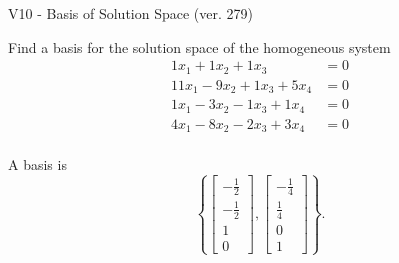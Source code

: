 \begin{exercise}
  \begin{exerciseTitle}V10 - Basis of Solution Space (ver. 279)\end{exerciseTitle}
  \begin{exerciseStatement}
    Find a basis for the solution space of the homogeneous system 
\begin{align*}
 1 x_ 1 + 1 x_ 2 + 1 x_ 3 &= 0  \\ 
  11 x_ 1 -9 x_ 2 + 1 x_ 3 + 5 x_ 4 &= 0  \\ 
  1 x_ 1 -3 x_ 2 -1 x_ 3 + 1 x_ 4 &= 0  \\ 
  4 x_ 1 -8 x_ 2 -2 x_ 3 + 3 x_ 4 &= 0  \\ 
 \end{align*}


 
  \end{exerciseStatement}

  \begin{exerciseAnswer}
   A basis is   
\[\left\{\left[\begin{array}{c}
-\frac{1}{2} \\
-\frac{1}{2} \\
1 \\
0
\end{array}\right] , \left[\begin{array}{c}
-\frac{1}{4} \\
\frac{1}{4} \\
0 \\
1
\end{array}\right]\right\}.\]

  


  \end{exerciseAnswer}
\end{exercise}